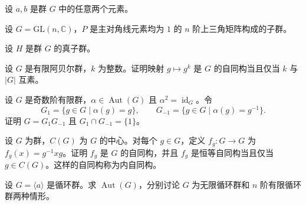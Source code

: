 \newpage
\noindent\begin{minipage}{\textwidth}
设 $a,b$ 是群 $G$ 中的任意两个元素。
\end{minipage}\par\vfill
\noindent\begin{minipage}{\textwidth}
设 $G=\mathrm{GL}(n,\mathbb{C})$，$P$ 是主对角线元素均为 $1$ 的 $n$ 阶上三角矩阵构成的子群。
\end{minipage}\par\vfill
\noindent\begin{minipage}{\textwidth}
设 $H$ 是群 $G$ 的真子群。
\end{minipage}\par\vfill
\newpage
\noindent\begin{minipage}{\textwidth}
设 $G$ 是有限阿贝尔群，$k$ 为整数。证明映射 $g\mapsto g^k$ 是 $G$ 的自同构当且仅当 $k$ 与 $|G|$ 互素。
\end{minipage}\par\vfill
\noindent\begin{minipage}{\textwidth}
设 $G$ 是奇数阶有限群，$\alpha\in\operatorname{Aut}(G)$ 且 $\alpha^2=\operatorname{id}_G$。令
\[
G_1=\{g\in G\mid \alpha(g)=g\},\qquad
G_{-1}=\{g\in G\mid \alpha(g)=g^{-1}\}.
\]
证明 $G=G_1G_{-1}$ 且 $G_1\cap G_{-1}=\{1\}$。
\end{minipage}\par\vfill
\noindent\begin{minipage}{\textwidth}
设 $G$ 为群，$C(G)$ 为 $G$ 的中心。对每个 $g\in G$，定义 $f_g:G\to G$ 为 $f_g(x)=g^{-1}xg$。证明 $f_g$ 是 $G$ 的自同构，并且 $f_g$ 是恒等自同构当且仅当 $g\in C(G)$。这样的自同构称为内自同构。
\end{minipage}\par\vfill
\newpage
\noindent\begin{minipage}{\textwidth}
设 $G=\langle a\rangle$ 是循环群。求 $\operatorname{Aut}(G)$，分别讨论 $G$ 为无限循环群和 $n$ 阶有限循环群两种情形。
\end{minipage}\par\vfill
